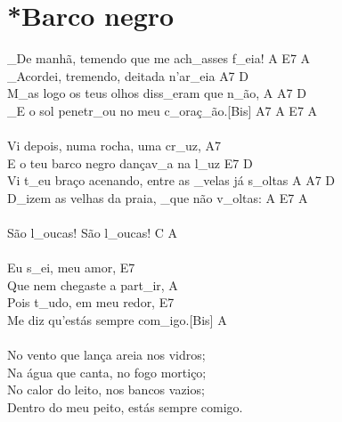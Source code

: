 \documentclass{article}
\begin{document}
\section{ *Barco negro}
_De manhã, temendo que me ach_asses f_eia!    A	E7	A\\
_Acordei, tremendo, deitada n'ar_eia      A7	D\\
M_as logo os teus olhos diss_eram que n_ão,     A	A7	D\\
_E o sol penetr_ou no meu c_oraç_ão.[Bis]     A7	A	E7	A\\
\\
Vi depois, numa rocha, uma cr_uz,        A7\\
E o teu barco negro dançav_a na l_uz     E7	D\\
Vi t_eu braço acenando, entre as _velas já s_oltas     A	A7  D\\
D_izem as velhas da praia, _que não v_oltas:   A   E7	A\\
\\
São l_oucas! São l_oucas!      C	A\\
\\
Eu s_ei, meu amor,      E7\\
Que nem chegaste a part_ir,      A\\
Pois t_udo, em meu redor,     E7\\
Me diz qu'estás sempre com_igo.[Bis]      A\\
\\
No vento que lança areia nos vidros;\\
Na água que canta, no fogo mortiço;\\
No calor do leito, nos bancos vazios;\\
Dentro do meu peito, estás sempre comigo.\\
\\
\end{document}
